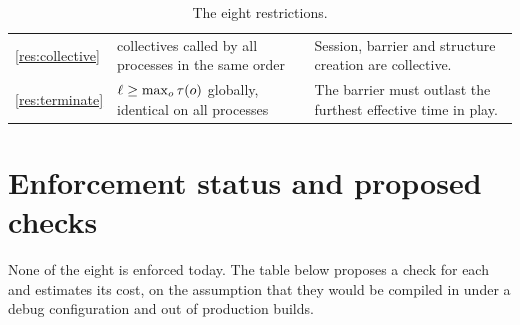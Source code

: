 \begin{table}[htbp]
\begin{tabularx}{\textwidth}{@{}l >{\raggedright\arraybackslash}p{4.3cm}
                                 >{\raggedright\arraybackslash}X@{}}
\cref{res:collective}
 & collectives called by all processes in the same order
 & Session, barrier and structure creation are collective. \\

\cref{res:terminate}
 & $\ell \ge \max_o \tau(o)$ globally, identical on all processes
 & The barrier must outlast the furthest effective time in play. \\

\bottomrule
\end{tabularx}
\caption{The eight restrictions.}
\label{tab:restrictions}
\end{table}

\section{Enforcement status and proposed checks}

None of the eight is enforced today. The table below proposes a check for each
and estimates its cost, on the assumption that they would be compiled in under
a debug configuration and out of production builds.

